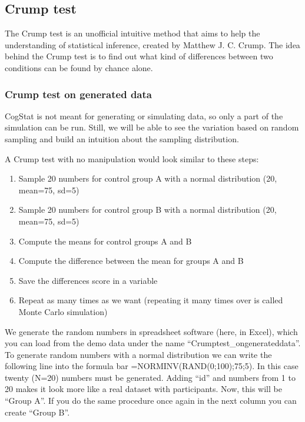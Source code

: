 \documentclass[
]{book}
\begin{document}
\hypertarget{crump-test}{%
\subsection{Crump test}\label{crump-test}}

The Crump test is an unofficial intuitive method that aims to help the understanding of statistical inference, created by Matthew J. C. Crump. The idea behind the Crump test is to find out what kind of differences between two conditions can be found by chance alone.

\hypertarget{crump-test-on-generated-data}{%
\subsubsection{Crump test on generated data}\label{crump-test-on-generated-data}}

CogStat is not meant for generating or simulating data, so only a part of the simulation can be run. Still, we will be able to see the variation based on random sampling and build an intuition about the sampling distribution.

A Crump test with no manipulation would look similar to these steps:

\begin{enumerate}
\def\labelenumi{\arabic{enumi}.}
\item
  Sample 20 numbers for control group A with a normal distribution (20, mean=75, sd=5)
\item
  Sample 20 numbers for control group B with a normal distribution (20, mean=75, sd=5)
\item
  Compute the means for control groups A and B
\item
  Compute the difference between the mean for groups A and B
\item
  Save the differences score in a variable
\item
  Repeat as many times as we want (repeating it many times over is called Monte Carlo simulation)
\end{enumerate}

We generate the random numbers in spreadsheet software (here, in Excel), which you can load from the demo data under the name ``Crumptest\_ongenerateddata''. To generate random numbers with a normal distribution we can write the following line into the formula bar =NORMINV(RAND(0;100);75;5). In this case twenty (N=20) numbers must be generated. Adding ``id'' and numbers from 1 to 20 makes it look more like a real dataset with participants. Now, this will be ``Group A''. If you do the same procedure once again in the next column you can create ``Group B''.
\end{document}
